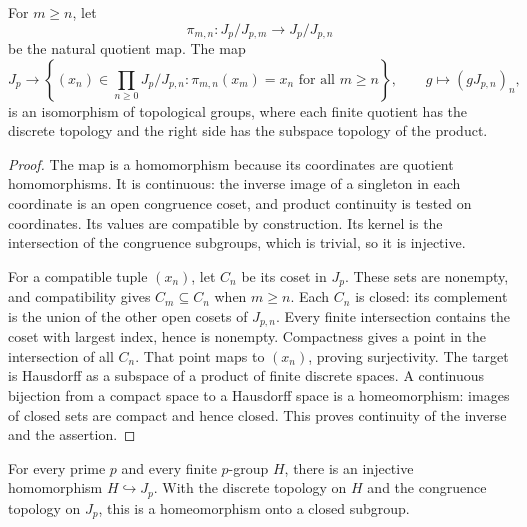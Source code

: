 \begin{lemma}
\label{lem:nottingham-inverse-limit}
\leanok
For $m\ge n$, let
\[\pi_{m,n}:J_p/J_{p,m}\longrightarrow J_p/J_{p,n}\]
be the natural quotient map. The map
\[
 J_p\longrightarrow
 \left\{(x_n)\in\prod_{n\ge0}J_p/J_{p,n}:
       \pi_{m,n}(x_m)=x_n\text{ for all }m\ge n\right\},
 \qquad g\longmapsto(gJ_{p,n})_n,
\]
is an isomorphism of topological groups, where each finite quotient
has the discrete topology and the right side has the subspace
topology of the product.
\end{lemma}

\begin{proof}
The map is a homomorphism because its coordinates are quotient
homomorphisms. It is continuous: the inverse image of a singleton in
each coordinate is an open congruence coset, and product continuity
is tested on coordinates. Its values are compatible by construction.
Its kernel is the intersection of the congruence subgroups, which is
trivial, so it is injective.

For a compatible tuple $(x_n)$, let $C_n$ be its coset in $J_p$.
These sets are nonempty, and compatibility gives $C_m\subseteq C_n$
when $m\ge n$. Each $C_n$ is closed: its complement is the union
of the other open cosets of $J_{p,n}$. Every finite intersection
contains the coset with largest index, hence is nonempty.
Compactness gives a point in the intersection of all $C_n$.
That point maps to $(x_n)$, proving surjectivity. The target is
Hausdorff as a subspace of a product of finite discrete spaces.
A continuous bijection from a compact space to a Hausdorff space is
a homeomorphism: images of closed sets are compact and hence closed.
This proves continuity of the inverse and the assertion.
\end{proof}







\begin{theorem}
\label{thm:nottingham-finite-p-group}
\leanok
For every prime $p$ and every finite $p$-group $H$, there is an
injective homomorphism $H\hookrightarrow J_p$. With the discrete
topology on $H$ and the congruence topology on $J_p$, this is a
homeomorphism onto a closed subgroup.
\end{theorem}

